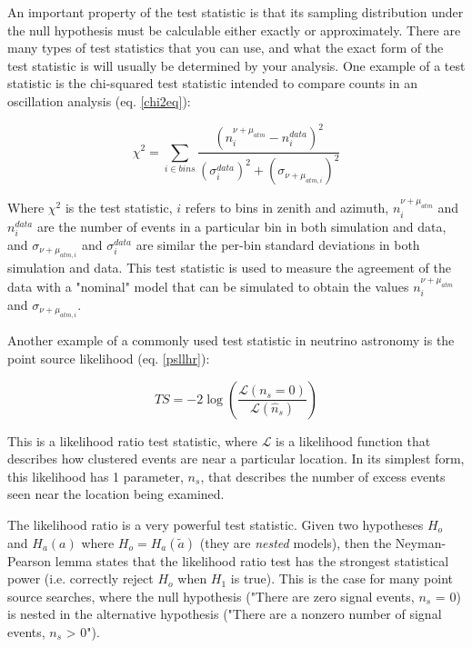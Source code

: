 An important property of the test statistic is that its sampling distribution under the null hypothesis must be calculable either exactly or approximately. There are many types of test statistics that you can use, and what the exact form of the test statistic is will usually be determined by your analysis. One example of a test statistic is the chi-squared test statistic intended to compare counts in an oscillation analysis (eq. \ref{chi2eq}):

\begin{equation}
    \chi^2 = \sum_{i \in {bins}} \frac{(n_i^{\nu+\mu_{atm}} - n_i^{data})^2} {(\sigma_i^{data})^2+(\sigma_{\nu+\mu_{atm,i}})^2} 
    \label{chi2eq}
\end{equation}

Where $\chi^2$ is the test statistic, $i$ refers to bins in zenith and azimuth, $n_i^{\nu+\mu_{atm}}$ and $n_i^{data}$ are the number of events in a particular bin in both simulation and data, and $\sigma_{\nu+\mu_{atm,i}}$  and $\sigma_i^{data}$ are similar the per-bin standard deviations in both simulation and data. This test statistic is used to measure the agreement of the data with a "nominal" model that can be simulated to obtain the values $n_i^{\nu+\mu_{atm}}$ and $\sigma_{\nu+\mu_{atm,i}}$. 

Another example of a commonly used test statistic in neutrino astronomy is the point source likelihood (eq. \ref{psllhr}):

\begin{equation}
    TS = -2 \log(\frac{\mathcal{L}(n_s=0)}{\mathcal{L}(\hat{n}_s)})
    \label{psllhr}
\end{equation}

This is a likelihood ratio test statistic, where $\mathcal{L}$ is a likelihood function that describes how clustered events are near a particular location. In its simplest form, this likelihood has 1 parameter, $n_s$, that describes the number of excess events seen near the location being examined. 

The likelihood ratio is a very powerful test statistic. Given two hypotheses $H_o$ and $H_a(a)$ where $H_o = H_a(\tilde{a})$ (they are \textit{nested} models), then the Neyman-Pearson lemma states that the likelihood ratio test has the strongest statistical power (i.e. correctly reject $H_o$ when $H_1$ is true). This is the case for many point source searches, where the null hypothesis ("There are zero signal events, $n_s$ = 0) is nested in the alternative hypothesis ("There are a nonzero number of signal events, $n_s$ > 0"). 

